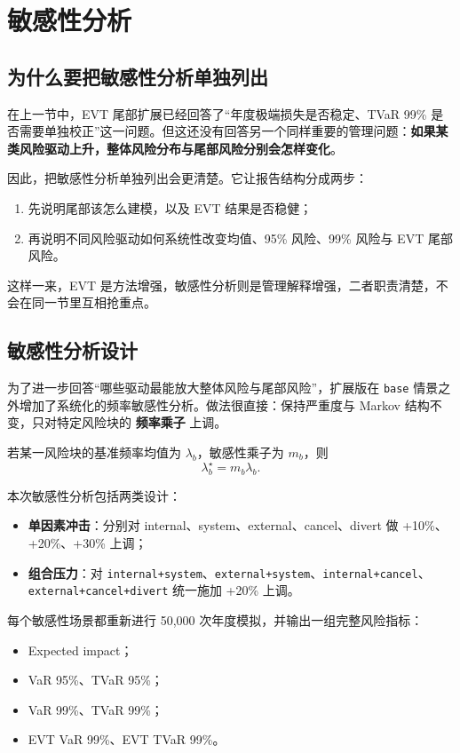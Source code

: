 \section{敏感性分析}

\subsection{为什么要把敏感性分析单独列出}

在上一节中，EVT 尾部扩展已经回答了“年度极端损失是否稳定、TVaR 99\% 是否需要单独校正”这一问题。但这还没有回答另一个同样重要的管理问题：\textbf{如果某类风险驱动上升，整体风险分布与尾部风险分别会怎样变化}。

因此，把敏感性分析单独列出会更清楚。它让报告结构分成两步：
\begin{enumerate}[leftmargin=2.2em]
  \item 先说明尾部该怎么建模，以及 EVT 结果是否稳健；
  \item 再说明不同风险驱动如何系统性改变均值、95\% 风险、99\% 风险与 EVT 尾部风险。
\end{enumerate}

这样一来，EVT 是方法增强，敏感性分析则是管理解释增强，二者职责清楚，不会在同一节里互相抢重点。

\subsection{敏感性分析设计}

为了进一步回答“哪些驱动最能放大整体风险与尾部风险”，扩展版在 \texttt{base} 情景之外增加了系统化的频率敏感性分析。做法很直接：保持严重度与 Markov 结构不变，只对特定风险块的 \textbf{频率乘子} 上调。

若某一风险块的基准频率均值为 $\lambda_b$，敏感性乘子为 $m_b$，则
\begin{equation}
\lambda_b^{\star} = m_b \lambda_b.
\end{equation}

本次敏感性分析包括两类设计：
\begin{itemize}[leftmargin=2.2em]
  \item \textbf{单因素冲击}：分别对 internal、system、external、cancel、divert 做 +10\%、+20\%、+30\% 上调；
  \item \textbf{组合压力}：对 \texttt{internal+system}、\texttt{external+system}、\texttt{internal+cancel}、\texttt{external+cancel+divert} 统一施加 +20\% 上调。
\end{itemize}

每个敏感性场景都重新进行 50{,}000 次年度模拟，并输出一组完整风险指标：
\begin{itemize}[leftmargin=2.2em]
  \item Expected impact；
  \item VaR 95\%、TVaR 95\%；
  \item VaR 99\%、TVaR 99\%；
  \item EVT VaR 99\%、EVT TVaR 99\%。
\end{itemize}

